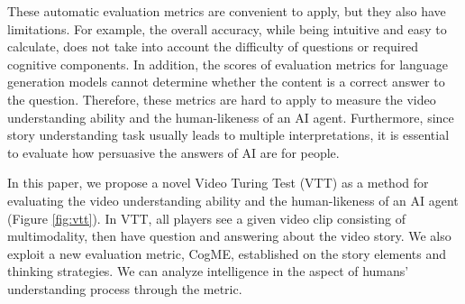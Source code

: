 \documentclass[letterpaper]{article} %
\begin{document}
These automatic evaluation metrics are convenient to apply, but they also have limitations. 
For example, the overall accuracy, while being intuitive and easy to calculate, does not take into account the difficulty of questions or required cognitive components.
In addition, the scores of evaluation metrics for language generation models cannot determine whether the content is a correct answer to the question. 
Therefore, these metrics are hard to apply to measure the video understanding ability and the human-likeness of an AI agent.
Furthermore, since story understanding task usually leads to multiple interpretations, it is essential to evaluate how persuasive the answers of AI are for people. 


In this paper, we propose a novel Video Turing Test (VTT) as a method for evaluating the video understanding ability and the human-likeness of an AI agent (Figure \ref{fig:vtt}). In VTT, all players see a given video clip consisting of multimodality, then have question and answering about the video story. We also exploit a new evaluation metric, CogME, established on the story elements and thinking strategies. We can analyze intelligence in the aspect of humans' understanding process through the metric.

\end{document}
